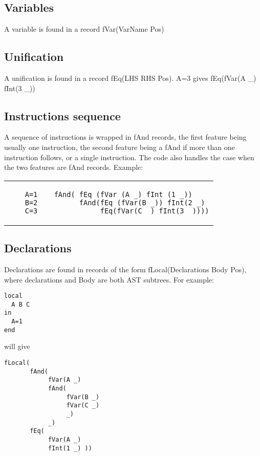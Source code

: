 \documentclass[a4paper]{memoir}
\begin{document}
\subsection{Variables}\label{sec:input:variables}
A variable is found in a record fVar(VarName Pos)

\subsection{Unification}
A unification is found in a record fEq(LHS RHS Pos).
A=3 gives fEq(fVar(A \_) fInt(3 \_))

\subsection{Instructions sequence}
A sequence of instructions is wrapped in fAnd records, the first feature being usually one instruction, the second feature being a fAnd if more than one instruction follows,  or a single instruction. The code also handles the case when the two features are fAnd records. %
Example:\\
\begin{tabular}{ p{} p{} }
  \begin{lstlisting}
    A=1
    B=2
    C=3
  \end{lstlisting}
&
  \footnotesize{
  \begin{verbatim}
  fAnd( fEq (fVar (A _) fInt (1 _))
        fAnd(fEq (fVar(B _)) fInt(2 _) 
             fEq(fVar(C _) fInt(3 _))))
  \end{verbatim}
  }
\end{tabular}

\subsection{Declarations}\label{sec:input:flocal}
Declarations are found in records of the form fLocal(Declarations Body Pos), where declarations and Body are both AST subtrees. 
For example:

\begin{lstlisting}
local
  A B C
in
  A=1
end
\end{lstlisting}
will give
\begin{verbatim}
fLocal(
       fAnd(
            fVar(A _) 
            fAnd(
                 fVar(B _) 
                 fVar(C _) 
                 _) 
            _) 
       fEq( 
            fVar(A _) 
            fInt(1 _) ))
\end{verbatim}
\end{document}
